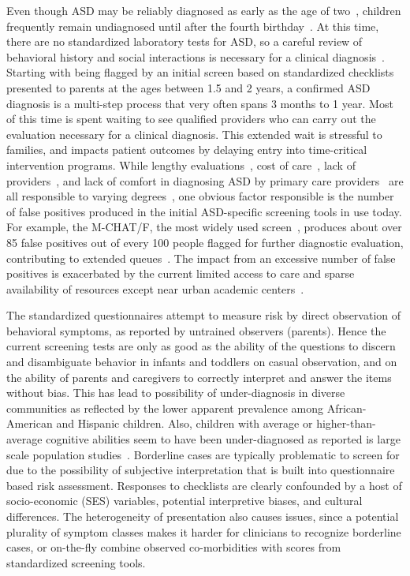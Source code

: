 \documentclass[onecolumn, compsoc,11pt]{IEEEtran}
\begin{document}
Even though ASD may be reliably diagnosed as early as the  age of two~\cite{cdc},  children frequently remain undiagnosed  until after the fourth birthday~\cite{pmid24529515}. At this time, there are no standardized laboratory tests for ASD, so a careful review of behavioral history and social interactions is necessary for a clinical diagnosis~\cite{volkmar2014practice,hyman2020identification}.  Starting with being flagged by an  initial screen based on standardized checklists presented to parents at the ages between 1.5 and 2 years, a confirmed ASD diagnosis  is a   multi-step process that very often spans  3 months to 1 year. Most of this time is spent waiting to see qualified providers who can carry out the  evaluation necessary for a clinical diagnosis. This extended wait is stressful to families, and  impacts  patient outcomes by  delaying entry into time-critical intervention programs. While   lengthy evaluations~\cite{kalb2012determinants}, cost of care~\cite{bisgaier2011access},  lack of providers~\cite{fenikile2015barriers}, and lack of comfort in diagnosing ASD by primary care providers~\cite{fenikile2015barriers} are all responsible to varying degrees~\cite{gordon2016whittling}, one  obvious factor responsible is the number of false positives produced in the initial ASD-specific screening tools in use today. For example, the  M-CHAT/F, the most widely used screen~\cite{robins2014validation,hyman2020identification},  produces about   over 85 false positives out of every 100 people flagged for further diagnostic evaluation, contributing to extended  queues~\cite{gordon2016whittling}. 
The impact from an excessive number of false positives is exacerbated by the current  limited  access to care and sparse availability of  resources  except near urban academic centers~\cite{gordon2016whittling,althouse2006pediatric}.

The standardized questionnaires attempt to measure risk by direct observation of behavioral symptoms, as reported by untrained observers (parents). Hence the current screening  tests are only as good as the ability of the questions to discern and disambiguate behavior in infants and toddlers on casual observation, and on the ability of parents and caregivers to correctly interpret and answer the items without bias.
This has lead to possibility of  under-diagnosis in diverse communities as reflected by the
lower apparent prevalence among African-American and Hispanic children. Also, children with average or higher-than-average cognitive abilities seem to have been under-diagnosed as reported is large scale population studies~\cite{hyman2020identification}. Borderline cases are typically problematic to screen for due to the possibility  of subjective interpretation that is built into questionnaire based risk assessment. Responses to checklists are clearly confounded by a host of socio-economic (SES) variables, potential interpretive biases, and  cultural differences. The heterogeneity of presentation also causes issues, since a potential plurality of symptom classes makes it harder for clinicians  to recognize borderline cases, or on-the-fly combine observed co-morbidities with scores from  standardized screening tools. 
\end{document}
